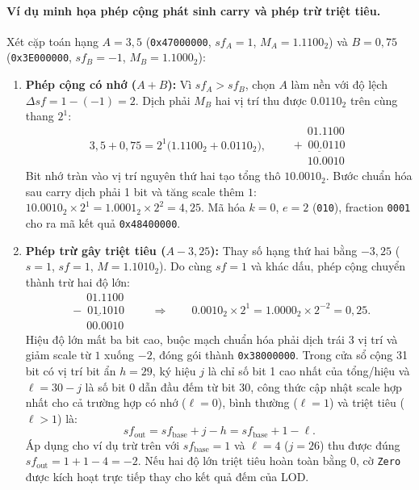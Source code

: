 \paragraph{Ví dụ minh họa phép cộng phát sinh carry và phép trừ triệt tiêu.}
Xét cặp toán hạng $A = 3{,}5$ (\texttt{0x47000000}, $sf_A = 1$, $M_A = 1.1100_2$)
và $B = 0{,}75$ (\texttt{0x3E000000}, $sf_B = -1$, $M_B = 1.1000_2$):
\begin{enumerate}
  \item \textbf{Phép cộng có nhớ ($A + B$):} Vì $sf_A > sf_B$, chọn $A$ làm nền
        với độ lệch $\Delta sf = 1 - (-1) = 2$. Dịch phải $M_B$ hai vị trí thu
        được $0.0110_2$ trên cùng thang $2^1$:
        \[
        3{,}5 + 0{,}75 = 2^1\bigl(1.1100_2 + 0.0110_2\bigr),
        \qquad
        \begin{array}{r}
          \phantom{+}01.1100\\
          \underline{+\phantom{0}00.0110}\\
          \phantom{+}10.0010
        \end{array}
        \]
        Bit nhớ tràn vào vị trí nguyên thứ hai tạo tổng thô $10.0010_2$. Bước chuẩn
        hóa sau carry dịch phải 1 bit và tăng scale thêm $1$:
        $10.0010_2 \times 2^1 = 1.0001_2 \times 2^2 = 4{,}25$. Mã hóa $k=0$, $e=2$
        (\texttt{010}), fraction \texttt{0001} cho ra mã kết quả \texttt{0x48400000}.
  \item \textbf{Phép trừ gây triệt tiêu ($A - 3{,}25$):} Thay số hạng thứ hai
        bằng $-3{,}25$ ($s=1$, $sf=1$, $M = 1.1010_2$). Do cùng $sf=1$ và khác
        dấu, phép cộng chuyển thành trừ hai độ lớn:
        \[
        \begin{array}{r}
          \phantom{-}01.1100\\
          \underline{-\phantom{0}01.1010}\\
          \phantom{-}00.0010
        \end{array}
        \qquad\Longrightarrow\qquad
        0.0010_2 \times 2^1 = 1.0000_2 \times 2^{-2} = 0{,}25.
        \]
        Hiệu độ lớn mất ba bit cao, buộc mạch chuẩn hóa phải dịch trái $3$ vị
        trí và giảm scale từ $1$ xuống $-2$, đóng gói thành \texttt{0x38000000}.
        Trong cửa sổ cộng 31 bit có vị trí bit ẩn $h=29$, ký hiệu $j$ là chỉ số
        bit 1 cao nhất của tổng/hiệu và $\ell = 30 - j$ là số bit 0 dẫn đầu đếm
        từ bit 30, công thức cập nhật scale hợp nhất cho cả trường hợp có nhớ
        ($\ell = 0$), bình thường ($\ell = 1$) và triệt tiêu ($\ell > 1$) là:
        \[
        sf_{\mathrm{out}} = sf_{\mathrm{base}} + j - h = sf_{\mathrm{base}} + 1 - \ell.
        \]
        Áp dụng cho ví dụ trừ trên với $sf_{\mathrm{base}}=1$ và $\ell=4$ ($j=26$)
        thu được đúng $sf_{\mathrm{out}} = 1 + 1 - 4 = -2$. Nếu hai độ lớn triệt
        tiêu hoàn toàn bằng $0$, cờ \texttt{Zero} được kích hoạt trực tiếp thay
        cho kết quả đếm của LOD.
\end{enumerate}

